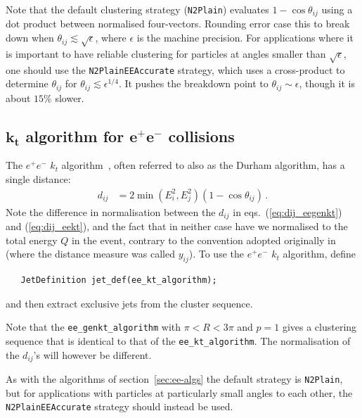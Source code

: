 \documentclass[12pt,a4]{article}
\newcommand{\ttt}[1]{{\small\texttt{#1}}}
\begin{document}
%
Note that the default clustering strategy (\ttt{N2Plain}) evaluates
$1- \cos\theta_{ij}$ using a dot product between normalised
four-vectors.
%
Rounding error case this to break down when
$\theta_{ij} \lesssim \sqrt{\epsilon}$, where $\epsilon$ is the
machine precision.
%
For applications where it is important to have reliable clustering for
particles at angles smaller than $\sqrt{\epsilon}$, one should use the
\ttt{N2PlainEEAccurate} strategy, which uses a cross-product to
determine $\theta_{ij}$ for $\theta_{ij} \lesssim \epsilon^{1/4}$.
%
It pushes the breakdown point to $\theta_{ij} \sim \epsilon$, though
it is about $15\%$ slower.
%


\subsection[$k_t$ algorithm for $e^+e^-$ collisions]
{$\boldsymbol{k_t}$ algorithm for $\boldsymbol{e^+e^-}$ collisions}
\label{sec:kt-ee-alg}

The $e^+e^-$ $k_t$ algorithm~\cite{eekt}, often referred to also as
the Durham algorithm,  has a single distance:
\begin{align}
  \label{eq:dij_eekt}
  d_{ij} &= 2 \min(E_i^{2}, E_j^{2}) (1- \cos \theta_{ij})\,.
\end{align}
Note the difference in normalisation between the $d_{ij}$ in
eqs.~(\ref{eq:dij_eegenkt}) and (\ref{eq:dij_eekt}), and the fact that in neither
case have we normalised to the total energy $Q$ in the event, contrary
to the convention adopted originally in~\cite{eekt} (where the
distance measure was called $y_{ij}$).
%
To use the $e^+e^-$ $k_t$  algorithm, define 
\begin{lstlisting}
   JetDefinition jet_def(ee_kt_algorithm);
\end{lstlisting}
and then extract exclusive jets from the cluster sequence.

%
Note that the \ttt{ee\_genkt\_algorithm} with $ \pi < R < 3\pi$ and
$p=1$ gives a clustering sequence that is identical to that of the
\ttt{ee\_kt\_algorithm}.
%
The normalisation of the $d_{ij}$'s will however be different.

As with the algorithms of section~\ref{sec:ee-algs} the default
strategy is \ttt{N2Plain}, but for applications with particles at
particularly small angles to each other, the \ttt{N2PlainEEAccurate}
strategy should instead be used.

\end{document}
